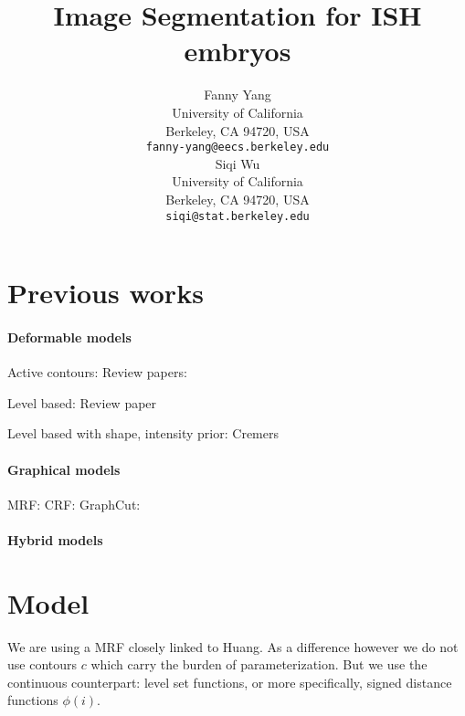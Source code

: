 \documentclass{article} %
\begin{document}
\title{Image Segmentation for ISH embryos}

\author{
Fanny Yang\\
University of California\\
Berkeley, CA 94720, USA\\
\texttt{fanny-yang@eecs.berkeley.edu} \\
\And
Siqi Wu\\
University of California\\
Berkeley, CA 94720, USA\\
\texttt{siqi@stat.berkeley.edu}\\
}

\maketitle

\section{Previous works}

\paragraph{Deformable models}
Active contours:
\cite{Cootes92_ActiveShape,Cootes01_ActiveApp, Cootes92_TrainingShape, Kass88_Snakes}
\cite{Sclaroff01_RegionGroup, ElBaz09_ShapeApp, Leventon00_ShapeGeodesic}
Review papers: \cite{McInerney96_MIReview, Baswaraj12_ACReview}

Level based:
\cite{Tsai03_MILevelSets, ChanVese01}
Review paper \cite{Cremers07_Levelreview}

Level based with shape, intensity prior:
Cremers \cite{Cremers06_KernelDensity, Chan05_LevelShape, Chen09_LevelShapeIntensity}

\paragraph{Graphical models}
MRF: CRF: \cite{Lafferty01_CRFSeq, He04_MultiScale}
GraphCut: \cite{Lempitsky_BranchMin}

\paragraph{Hybrid models}
\cite{Huang04_MRFDM, Chen12_MIGraphCut, Uzunbas13_MultiOrgan, Schlesinger13}


\section{Model}
We are using a MRF closely linked to Huang. As a difference however we do not use contours $c$ which carry the burden of parameterization. But we use the continuous counterpart: level set functions, or more specifically, signed distance functions $\phi(i)$.
\end{document}
